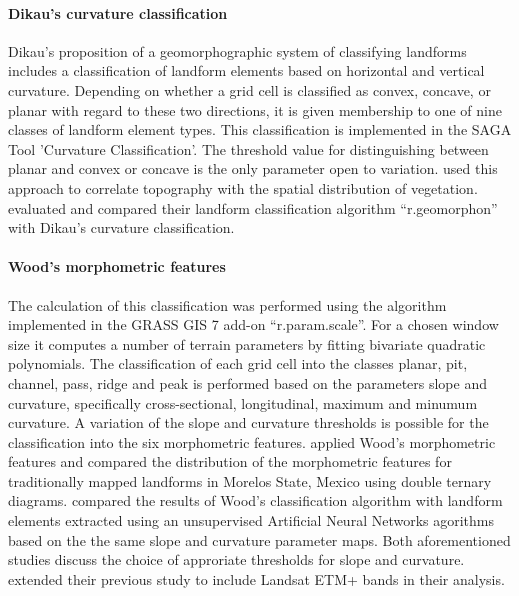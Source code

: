 \documentclass[final,1p,times,twocolumn,authoryear]{elsarticle}
\begin{document}
\paragraph{Dikau's curvature classification \citep{Dikau1988}}
Dikau's proposition of a geomorphographic system of classifying landforms includes a classification of landform elements based on horizontal and vertical curvature. Depending on whether a grid cell is classified as convex, concave, or  planar with regard to these two directions, it is given membership to one of nine classes of landform element types. This classification is implemented in the SAGA Tool 'Curvature Classification'. The threshold value for distinguishing between planar and convex or concave is the only parameter open to variation. \cite{Hoersch2002} used this approach to correlate topography with the spatial distribution of vegetation. \cite{Jasiewicz2013} evaluated and compared their landform classification algorithm “r.geomorphon” with Dikau's curvature classification.
\paragraph{Wood's morphometric features \citep{Wood1996}}
The calculation of this classification was performed using the algorithm implemented in the GRASS GIS 7  add-on “r.param.scale”.  For a chosen window size it computes a number of terrain parameters by fitting bivariate quadratic polynomials.  The classification of each grid cell into the classes planar, pit, channel, pass, ridge and peak is performed based on the parameters slope and curvature, specifically cross-sectional, longitudinal, maximum and minumum curvature. A variation of  the slope and curvature thresholds is possible for the classification into the six morphometric features.
\cite{Bolongaro-Crevenna2005} applied Wood's morphometric features and compared the distribution of the morphometric features for traditionally mapped landforms in Morelos State, Mexico using double ternary diagrams. \cite{Ehsani2008} compared the results of Wood's classification algorithm with landform elements extracted using  an unsupervised Artificial Neural Networks agorithms based on the the same slope and curvature parameter maps. Both aforementioned studies discuss the choice of approriate thresholds for slope and curvature. \cite{Ehsani2009} extended their previous study  to include Landsat ETM+ bands in their analysis.  
\end{document}
